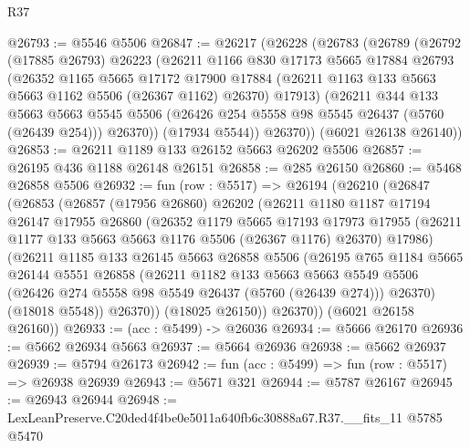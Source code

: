 \begin{lexlean}{R37}
\begin{coremodule}
@26793 := @5546 @5506
@26847 := @26217
    (@26228
      (@26783
        (@26789
          (@26792
            (@17885 @26793)
            @26223
            (@26211
              @1166
              @830
              @17173
              @5665
              @17884
              @26793
              (@26352
                @1165
                @5665
                @17172
                @17900
                @17884
                (@26211 @1163 @133 @5663 @5663 @1162 @5506 (@26367 @1162) @26370)
                @17913)
              (@26211
                @344
                @133
                @5663
                @5663
                @5545
                @5506
                (@26426 @254 @5558 @98 @5545 @26437 (@5760 (@26439 @254)))
                @26370))
            (@17934 @5544))
          @26370))
      (@6021 @26138 @26140))
@26853 := @26211 @1189 @133 @26152 @5663 @26202 @5506
@26857 := @26195 @436 @1188 @26148 @26151
@26858 := @285 @26150
@26860 := @5468 @26858 @5506
@26932 := fun (row : @5517) =>
  @26194
    (@26210
      (@26847
        (@26853
          (@26857
            (@17956 @26860)
            @26202
            (@26211
              @1180
              @1187
              @17194
              @26147
              @17955
              @26860
              (@26352
                @1179
                @5665
                @17193
                @17973
                @17955
                (@26211 @1177 @133 @5663 @5663 @1176 @5506 (@26367 @1176) @26370)
                @17986)
              (@26211
                @1185
                @133
                @26145
                @5663
                @26858
                @5506
                (@26195
                  @765
                  @1184
                  @5665
                  @26144
                  @5551
                  @26858
                  (@26211
                    @1182
                    @133
                    @5663
                    @5663
                    @5549
                    @5506
                    (@26426 @274 @5558 @98 @5549 @26437 (@5760 (@26439 @274)))
                    @26370)
                  (@18018 @5548))
                @26370))
            (@18025 @26150))
          @26370))
      (@6021 @26158 @26160))
@26933 := (acc : @5499) -> @26036
@26934 := @5666 @26170
@26936 := @5662 @26934 @5663
@26937 := @5664 @26936
@26938 := @5662 @26937
@26939 := @5794 @26173
@26942 := fun (acc : @5499) => fun (row : @5517) => @26938 @26939
@26943 := @5671 @321
@26944 := @5787 @26167
@26945 := @26943 @26944
@26948 := LexLeanPreserve.C20ded4f4be0e5011a640fb6c30888a67.R37.__fits_11 @5785 @5470

\end{coremodule}
\end{lexlean}

